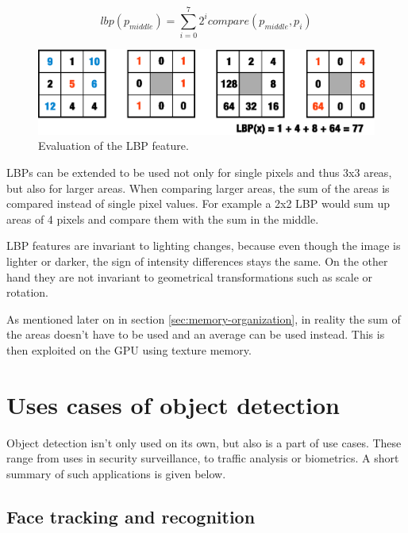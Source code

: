 \begin{equation}
lbp(p_{middle})=\sum_{i=0}^{7} 2^{i}
compare(p_{middle},p_{i})
\end{equation}

\begin{center}
\begin{figure}[ht]
	\centering\includegraphics[width=12cm]{fig/lbp.eps}
	\caption{Evaluation of the LBP feature.}
	\label{fig:lbp}
\end{figure}
\end{center}

LBPs can be extended to be used not only for single pixels and thus 3x3 areas, but also for larger areas. When comparing larger areas, the sum of the areas is compared instead of single pixel values. For example a 2x2 LBP would sum up areas of 4 pixels and compare them with the sum in the middle.

LBP features are invariant to lighting changes, because even though the image is lighter or darker, the sign of intensity differences stays the same. On the other hand they are not invariant to geometrical transformations such as scale or rotation.

As mentioned later on in section \ref{sec:memory-organization}, in reality the sum of the areas doesn't have to be used and an average can be used instead. This is then exploited on the GPU using texture memory.

\section{Uses cases of object detection}\label{sec:use-cases}

Object detection isn't only used on its own, but also is a part of use cases. These range from uses in security surveillance, to traffic analysis or biometrics. A short summary of such applications is given below.

\subsection{Face tracking and recognition}\label{subsec:uc-face-tracking}

